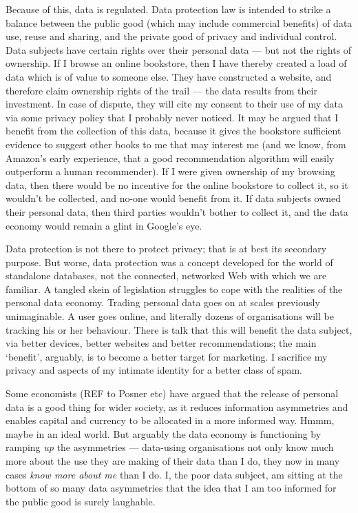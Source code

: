 \documentclass[runningheads,a4paper]{llncs}
\begin{document}
Because of this, data is regulated. Data protection law is intended to strike a balance between the public good (which may include commercial benefits) of data use, reuse and sharing, and the private good of privacy and individual control. Data subjects have certain rights over their personal data --- but not the rights of ownership. If I browse an online bookstore, then I have thereby created a load of data which is of value to someone else. They have constructed a website, and therefore claim ownership rights of the trail --- the data results from their investment. In case of dispute, they will cite my consent to their use of my data via some privacy policy that I probably never noticed. It may be argued that I benefit from the collection of this data, because it gives the bookstore sufficient evidence to suggest other books to me that may interest me (and we know, from Amazon's early experience, that a good recommendation algorithm will easily outperform a human recommender). If I were given ownership of my browsing data, then there would be no incentive for the online bookstore to collect it, so it wouldn't be collected, and no-one would benefit from it. If data subjects owned their personal data, then third parties wouldn't bother to collect it, and the data economy would remain a glint in Google's eye.

Data protection is not there to protect privacy; that is at best its secondary purpose. But worse, data protection was a concept developed for the world of standalone databases, not the connected, networked Web with which we are familiar. A tangled skein of legislation struggles to cope with the realities of the personal data economy. Trading personal data goes on at scales previously unimaginable. A user goes online, and literally dozens of organisations will be tracking his or her behaviour. There is talk that this will benefit the data subject, via better devices, better websites and better recommendations; the main `benefit', arguably, is to become a better target for marketing. I sacrifice my privacy and aspects of my intimate identity for a better class of spam.

Some economists (REF to Posner etc) have argued that the release of personal data is a good thing for wider society, as it reduces information asymmetries and enables capital and currency to be allocated in a more informed way. Hmmm, maybe in an ideal world. But arguably the data economy is functioning by ramping {\em up} the asymmetries --- data-using organisations not only know much more about the use they are making of their data than I do, they now in many cases {\em know more about me} than I do. I, the poor data subject, am sitting at the bottom of so many data asymmetries that the idea that I am too informed for the public good is surely laughable.
\end{document}
